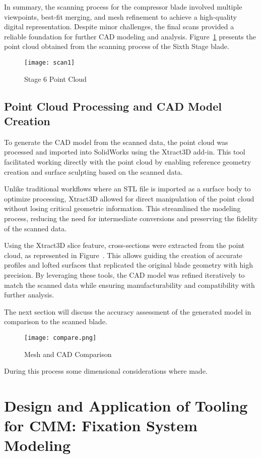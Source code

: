 In summary, the scanning process for the compressor blade involved multiple viewpoints, best-fit merging, and mesh refinement to achieve a high-quality digital representation. Despite minor challenges, the final scans provided a reliable foundation for further CAD modeling and analysis. Figure~\ref{fig:scan1} presents the point cloud obtained from the scanning process of the Sixth Stage blade.

\begin{figure}[H]
    \centering
    \texttt{[image: scan1]}
    \caption{Stage 6 Point Cloud}
    \label{fig:scan1}
\end{figure}

\section{Point Cloud Processing and CAD Model Creation}
\label{sec:cad}

To generate the CAD model from the scanned data, the point cloud was processed and imported into SolidWorks using the Xtract3D add-in. This tool facilitated working directly with the point cloud by enabling reference geometry creation and surface sculpting based on the scanned data.

Unlike traditional workflows where an STL file is imported as a surface body to optimize processing, Xtract3D allowed for direct manipulation of the point cloud without losing critical geometric information. This streamlined the modeling process, reducing the need for intermediate conversions and preserving the fidelity of the scanned data.

Using the Xtract3D slice feature, cross-sections were extracted from the point cloud, as represented in Figure~. This allows guiding the creation of accurate profiles and lofted surfaces that replicated the original blade geometry with high precision. By leveraging these tools, the CAD model was refined iteratively to match the scanned data while ensuring manufacturability and compatibility with further analysis.

The next section will discuss the accuracy assessment of the generated model in comparison to the scanned blade.

\begin{figure}[H]
    \centering
    \texttt{[image: compare.png]}
    \caption{Mesh and CAD Comparison}
    \label{fig:compare.png}
\end{figure}

During this process some dimensional considerations where made.

\chapter{Design and Application of Tooling for CMM: Fixation System Modeling}
\label{cha:dig}











